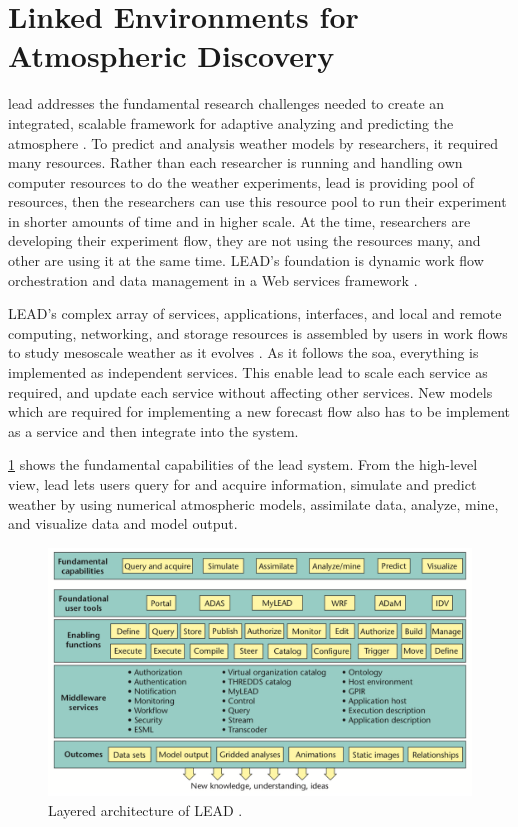 \section{Linked Environments for Atmospheric Discovery}
\label{se:lead}

\acrfull{lead} addresses the fundamental research challenges needed to create an integrated, scalable framework for adaptive analyzing and predicting the atmosphere \cite{Droegemeier2005Service-OrientedWeather}. To predict and analysis weather models by researchers, it required many resources. Rather than each researcher is running and handling own computer resources to do the weather experiments, \acrshort{lead} is providing pool of resources, then the researchers can use this resource pool to run their experiment in shorter amounts of time and in higher scale. At the time, researchers are developing their experiment flow, they are not using the resources many, and other are using it at the same time. LEAD's foundation is dynamic work flow orchestration and data management in a Web services framework \cite{Droegemeier2005Service-OrientedWeather}.

LEAD's complex array of services, applications, interfaces, and local and remote computing, networking, and storage resources is assembled by users in work flows to study mesoscale weather as it evolves \cite{Droegemeier2005Service-OrientedWeather}. As it follows the \acrshort{soa}, everything is implemented as independent services. This enable \acrshort{lead} to scale each service as required, and update each service without affecting other services. New models which are required for implementing a new forecast flow also has to be implement as a service and then integrate into the system.

\cref{fi:lead_system} shows the fundamental capabilities of the \acrshort{lead} system. From the high-level view, \acrshort{lead} lets users query for and acquire information, simulate and predict weather by using numerical atmospheric models, assimilate data, analyze, mine, and visualize data and model output.

\begin{figure}[htp]
    \centering
    \includegraphics[width=1.0\textwidth]{lit/lead/LEAD-system-Fundamental-capabilities-familiar-to-meteorologists-are-shown-in-the-top_W640.png}
    \caption[Layered architecture of LEAD]{Layered architecture of LEAD \cite{Droegemeier2005Service-OrientedWeather}.}
    \label{fi:lead_system}
\end{figure}


